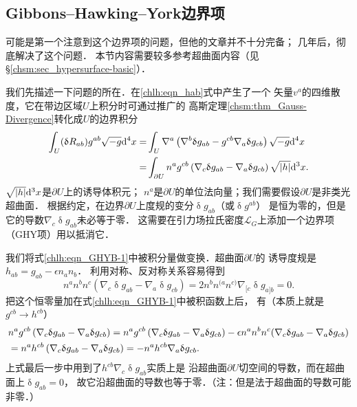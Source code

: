 \subsection{Gibbons--Hawking--York边界项}\label{chlh:sec_GHYB}
\textcite{York-1972}可能是第一个注意到这个边界项的问题，但他的文章并不十分完备；
几年后，\textcite{Gibbons-Hawking-1977}彻底解决了这个问题．
本节内容需要较多参考超曲面内容（见\S\ref{chsm:sec_hypersurface-basic}）．


我们先描述一下问题的所在．在\eqref{chlh:eqn_hab}式中产生了一个
矢量$v^a$的四维散度，它在带边区域$U$上积分时可通过推广的
高斯定理\ref{chsm:thm_Gauss-Divergence}转化成$U$的边界积分
\begin{equation}\label{chlh:eqn_GHYB-1}
\begin{aligned}
    \int_U (\updelta R_{ab}) g^{ab} \sqrt{-g} {\rm d}^{4}x
     =&  \int_U  \nabla^a \left(\nabla^b \updelta g_{ab}
      - g^{cb} \nabla_a \updelta g_{cb}\right)  \sqrt{-g} {\rm d}^{4}x \\
     =&  \int_{\partial U} n^a g^{cb} \left(\nabla_c \updelta g_{ab}
     -  \nabla_a \updelta g_{cb}\right)
     \sqrt{|h|} {\rm d}^{3}x .
\end{aligned}
\end{equation}
$\sqrt{|h|} {\rm d}^{3}x$是$\partial U$上的诱导体积元；
$n^a$是$\partial U$的单位法向量；我们需要假设$\partial U$是非类光超曲面．
根据约定，在边界$\partial U$上度规的变分$\updelta g_{ab}$（或$\updelta g^{ab}$）
是恒为零的，但是它的导数$\nabla_c \updelta g_{ab}$未必等于零．
这需要在引力场拉氏密度$\mathscr{L}_G$上添加一个边界项（GHY项）用以抵消它．

我们将式\eqref{chlh:eqn_GHYB-1}中被积分量做变换．超曲面$\partial U$的
诱导度规是$h_{ab}= g_{ab}- \epsilon {n}_a {n}_b$．
利用对称、反对称关系容易得到
\begin{equation}
    n^a n^b n^c (\nabla_c \updelta g_{ab} -\nabla_a \updelta g_{cb})
    =2n^b n^{(a}  n^{c)} \nabla_{[c} \updelta g_{a]b} =0 .
\end{equation}
把这个恒零量加在式\eqref{chlh:eqn_GHYB-1}中被积函数上后，
有（本质上就是$g^{cb} \to h^{cb}$）
\begin{align}
    & n^a g^{cb} \left(\nabla_c \updelta g_{ab} - \nabla_a \updelta g_{cb}\right)
    = n^a g^{cb} \left(\nabla_c \updelta g_{ab} - \nabla_a \updelta g_{cb}\right)  
      -\epsilon n^a n^b n^c (\nabla_c \updelta g_{ab} - \nabla_a \updelta g_{cb}) \notag \\
    &= n^a h^{cb} \left(\nabla_c \updelta g_{ab} - \nabla_a \updelta g_{cb}\right)
    = - n^a h^{cb} \nabla_a \updelta g_{cb} .\label{chlh:eqn_tmp9}
\end{align}  %
上式最后一步中用到了$h^{cb} \nabla_c \updelta g_{ab}$实质上是
沿超曲面$\partial U$切空间的导数，而在超曲面上$\updelta g_{ab}=0$，
故它沿超曲面的导数也等于零．（注：但是法于超曲面的导数可能非零．）

